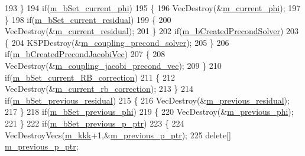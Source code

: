 \begin{DoxyCode}
193     \}
194     \textcolor{keywordflow}{if}(\hyperlink{classcarl_1_1_f_e_t_i___operations_af9131d1125ae99d73932d11ee5c4c7b7}{m\_bSet\_current\_phi})
195     \{
196         VecDestroy(&\hyperlink{classcarl_1_1_f_e_t_i___operations_ac0f0857e6070cde78612b0ce5e1005e8}{m\_current\_phi});
197     \}
198     \textcolor{keywordflow}{if}(\hyperlink{classcarl_1_1_f_e_t_i___operations_a1f1f890054d63bdf25937e6bf66fa5ce}{m\_bSet\_current\_residual})
199     \{
200         VecDestroy(&\hyperlink{classcarl_1_1_f_e_t_i___operations_a6b1154885f5b8303ecbd32ea76df40e5}{m\_current\_residual});
201     \}
202     \textcolor{keywordflow}{if}(\hyperlink{classcarl_1_1_f_e_t_i___operations_a13dd551fd49ca08e4595c7829ccc90b8}{m\_bCreatedPrecondSolver})
203     \{
204         KSPDestroy(&\hyperlink{classcarl_1_1_f_e_t_i___operations_a46747376395ca3167a318a3ce6f6da51}{m\_coupling\_precond\_solver});
205     \}
206     \textcolor{keywordflow}{if}(\hyperlink{classcarl_1_1_f_e_t_i___operations_a49ca6d93078c918d738d64388b74f589}{m\_bCreatedPrecondJacobiVec})
207     \{
208         VecDestroy(&\hyperlink{classcarl_1_1_f_e_t_i___operations_a1d88407c07e4b6a4802e2f4e49015b32}{m\_coupling\_jacobi\_precond\_vec});
209     \}
210     \textcolor{keywordflow}{if}(\hyperlink{classcarl_1_1_f_e_t_i___operations_a4ba412e4dc2d64b62ebcf81773ed5ce8}{m\_bSet\_current\_RB\_correction})
211     \{
212         VecDestroy(&\hyperlink{classcarl_1_1_f_e_t_i___operations_a482c32e0a89fe4c8aca206ec4e04c67a}{m\_current\_rb\_correction});
213     \}
214     \textcolor{keywordflow}{if}(\hyperlink{classcarl_1_1_f_e_t_i___operations_a2368fc7147e38fa780d89e0b2c676d5d}{m\_bSet\_previous\_residual})
215     \{
216         VecDestroy(&\hyperlink{classcarl_1_1_f_e_t_i___operations_a3097f0040b5f00a717883840c95ca7e6}{m\_previous\_residual});
217     \}
218     \textcolor{keywordflow}{if}(\hyperlink{classcarl_1_1_f_e_t_i___operations_a76ef85eba8cceba4cfc8bc167d8dd73f}{m\_bSet\_previous\_phi})
219     \{
220         VecDestroy(&\hyperlink{classcarl_1_1_f_e_t_i___operations_a55eed597eea536ba6d7956267b178a89}{m\_previous\_phi});
221     \}
222     \textcolor{keywordflow}{if}(\hyperlink{classcarl_1_1_f_e_t_i___operations_ae9861d8f6bfefdf2e7b8be5683e88a6f}{m\_bSet\_previous\_p\_ptr})
223     \{
224         VecDestroyVecs(\hyperlink{classcarl_1_1_f_e_t_i___operations_aae9d8e6d2d0436cda061359f1602b096}{m\_kkk}+1,&\hyperlink{classcarl_1_1_f_e_t_i___operations_acc8155a94e5289396768f891b9c29627}{m\_previous\_p\_ptr});
225         \textcolor{keyword}{delete}[] \hyperlink{classcarl_1_1_f_e_t_i___operations_acc8155a94e5289396768f891b9c29627}{m\_previous\_p\_ptr};

\end{DoxyCode}
